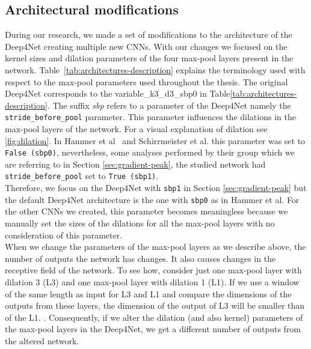 \subsection{Architectural modifications}\label{subsec:architectural-modifications}
During our research, we made a set of modifications to the architecture of the Deep4Net creating multiple new CNNs.
With our changes we focused on the kernel sizes and dilation parameters of the four max-pool layers present in the network.
Table~\ref{tab:architectures-description} explains the terminology used with respect to the max-pool parameters used throughout the thesis.
The original Deep4Net corresponds to the {variable}\_k3\_d3\_sbp0 in Table\ref{tab:architectures-description}.
The suffix \textit{sbp} refers to a parameter of the Deep4Net namely the \texttt{stride\_before\_pool} parameter.
This parameter influences the dilations in the max-pool layers of the network.
For a visual explanation of dilation see \ref{fig:dilation}.
In Hammer et al~\cite{Hammer-2021} and Schirrmeister et al. \cite{schirrmeister-deep-2017}this parameter was set to \texttt{False (sbp0)}, nevertheless, some analyses performed by their group which we are referring to in Section \cref{sec:gradient-peak}, the studied network had \texttt{stride\_before\_pool} set to \texttt{True (sbp1)}. \\

Therefore, we focus on the Deep4Net with \texttt{sbp1} in Section \ref{sec:gradient-peak} but the default Deep4Net architecture is the one with \texttt{sbp0} as in Hammer et al. For the other CNNs we created, this parameter becomes meaningless because we manually set the sizes of the dilations for all the max-pool layers with no consideration of this parameter. \\

When we change the parameters of the max-pool layers as we describe above, the number of outputs the network has changes.
It also causes changes in the receptive field of the network.
To see how, consider just one max-pool layer with dilation 3 (L3) and one max-pool layer with dilation 1 (L1). 
If we use a window of the same length as input for L3 and L1 and compare the dimensions of the outputs from these layers, the dimension of the output of L3 will be smaller than of the L1.
.
Consequently, if we alter the dilation (and also kernel) parameters of the max-pool layers in the Deep4Net, we get a different number of outputs from the altered network.  \\

